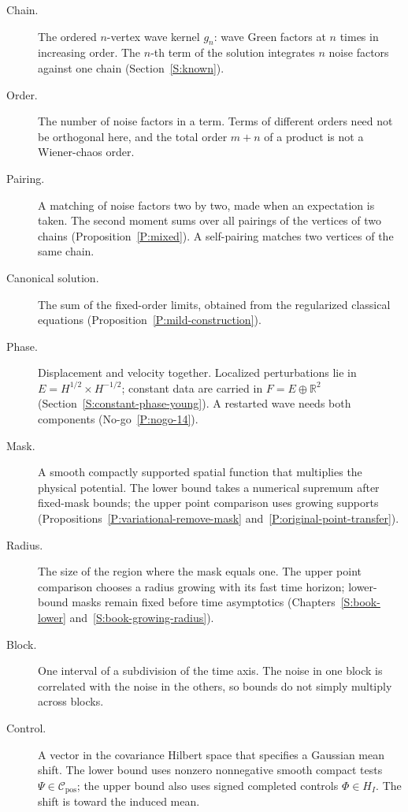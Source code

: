 \begin{description}
  \item[Chain.] The ordered $n$-vertex wave kernel $g_n$: wave Green factors
    at $n$ times in increasing order. The $n$-th term of the solution
    integrates $n$ noise factors against one chain (Section~\ref{S:known}).
  \item[Order.] The number of noise factors in a term. Terms of different
    orders need not be orthogonal here, and the total order $m+n$ of a product
    is not a Wiener-chaos order.
  \item[Pairing.] A matching of noise factors two by two, made when an
    expectation is taken. The second moment sums over all pairings of the
    vertices of two chains (Proposition~\ref{P:mixed}). A self-pairing matches
    two vertices of the same chain.
  \item[Canonical solution.] The sum of the fixed-order limits, obtained from
    the regularized classical equations
    (Proposition~\ref{P:mild-construction}).
  \item[Phase.] Displacement and velocity together. Localized perturbations
    lie in $E=H^{1/2}\times H^{-1/2}$; constant data are carried in
    $F=E\oplus\mathbb{R}^2$ (Section~\ref{S:constant-phase-young}).
    A restarted wave needs both components (No-go~\ref{P:nogo-14}).
  \item[Mask.] A smooth compactly supported spatial function that multiplies
    the physical potential. The lower bound takes a numerical supremum after
    fixed-mask bounds; the upper point comparison uses growing supports
    (Propositions~\ref{P:variational-remove-mask} and~\ref{P:original-point-transfer}).
  \item[Radius.] The size of the region where the mask equals one.
    The upper point comparison chooses a radius growing with its fast time
    horizon; lower-bound masks remain fixed before time asymptotics
    (Chapters~\ref{S:book-lower} and~\ref{S:book-growing-radius}).
  \item[Block.] One interval of a subdivision of the time axis. The noise in
    one block is correlated with the noise in the others, so bounds do not
    simply multiply across blocks.
  \item[Control.] A vector in the covariance Hilbert space that specifies a
    Gaussian mean shift. The lower bound uses nonzero nonnegative smooth
    compact tests $\Psi\in\mathcal{C}_{\mathrm{pos}}$; the upper bound also
    uses signed completed controls $\Phi\in H_I$.
    The shift is toward the induced mean.

\end{description}
